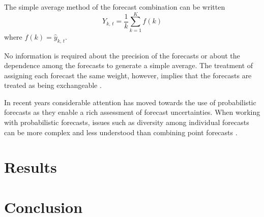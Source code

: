 \documentclass[
a4paper, %
12pt, %
]{CascadeAnalyticsWPS}
\begin{document}
The simple average method of the forecast combination can be written 
\begin{equation}
Y_{k,\,t} = \frac{1}{k}\sum\limits_{k =1}^{K}f(k)
\end{equation}
where $f(k) = \hat{y}_{k,\,t}$.

No information is required about the precision of the forecasts or about the dependence among the forecasts to generate a simple average. The treatment of assigning each forecast the same weight, however, implies that the forecasts are treated as being exchangeable \citep{clemen86}. 

In recent years considerable attention has moved towards the use of probabilistic forecasts \citep{gaglianone2014, KAPETANIOS2015, martin2022} as they enable a rich assessment of forecast uncertainties. When working with probabilistic forecasts, issues such as diversity among individual forecasts can be more complex and less understood than combining point forecasts \citep{ranjan2010}.

\section{Results}

\section{Conclusion}


\end{document}
